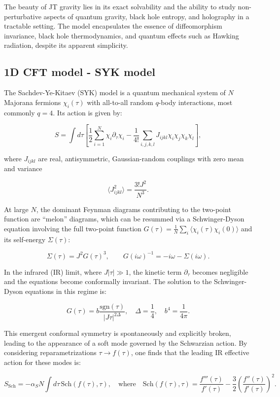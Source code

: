 The beauty of JT gravity lies in its exact solvability and the ability to study non-perturbative aspects of quantum gravity, black hole entropy, and holography in a tractable setting. The model encapsulates the essence of diffeomorphism invariance, black hole thermodynamics, and quantum effects such as Hawking radiation, despite its apparent simplicity.


\subsection{1D CFT model - SYK model}
The Sachdev-Ye-Kitaev (SYK) model is a quantum mechanical system of $N$ Majorana fermions $\chi_i(\tau)$ with all-to-all random $q$-body interactions, most commonly $q = 4$. Its action is given by:

$$
S = \int d\tau \left[ \frac{1}{2} \sum_{i=1}^{N} \chi_i \partial_\tau \chi_i - \frac{1}{4!} \sum_{i,j,k,l} J_{ijkl} \chi_i \chi_j \chi_k \chi_l \right],
$$

where $J_{ijkl}$ are real, antisymmetric, Gaussian-random couplings with zero mean and variance

$$
\langle J_{ijkl}^2 \rangle = \frac{3! J^2}{N^3}.
$$

At large $N$, the dominant Feynman diagrams contributing to the two-point function are “melon” diagrams, which can be resummed via a Schwinger-Dyson equation involving the full two-point function $G(\tau) = \frac{1}{N} \sum_i \langle \chi_i(\tau) \chi_i(0) \rangle$ and its self-energy $\Sigma(\tau)$:

$$
\Sigma(\tau) = J^2 G(\tau)^3, \qquad G(i\omega)^{-1} = -i\omega - \Sigma(i\omega).
$$

In the infrared (IR) limit, where $J|\tau| \gg 1$, the kinetic term $\partial_\tau$ becomes negligible and the equations become conformally invariant. The solution to the Schwinger-Dyson equations in this regime is:

$$
G(\tau) = b \frac{\text{sgn}(\tau)}{|J \tau|^{2\Delta}}, \quad \Delta = \frac{1}{4}, \quad b^4 = \frac{1}{4\pi}.
$$

This emergent conformal symmetry is spontaneously and explicitly broken, leading to the appearance of a soft mode governed by the Schwarzian action. By considering reparametrizations $\tau \to f(\tau)$, one finds that the leading IR effective action for these modes is:

$$
S_{\text{Sch}} = -\alpha_S N \int d\tau \, \text{Sch}(f(\tau), \tau), \quad \text{where} \quad \text{Sch}(f(\tau), \tau) = \frac{f'''(\tau)}{f'(\tau)} - \frac{3}{2} \left( \frac{f''(\tau)}{f'(\tau)} \right)^2.
$$

